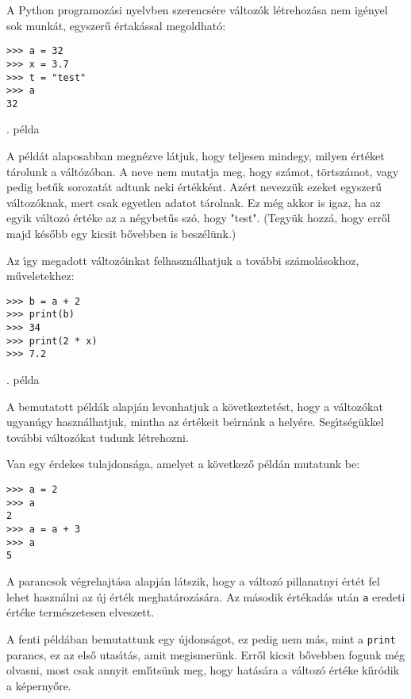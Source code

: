 \documentclass[12pt]{article}
\newcounter{minta}[section]
\newcommand{\incminta}{\stepcounter{minta}}
\newcounter{megold}
\begin{document}
A Python programoz\'asi nyelvben szerencs\'ere v\'altoz\'ok l\'etrehoz\'asa nem ig\'enyel sok 
munk\'at, egyszer\H{u} \'ertak\'assal megoldhat\'o:

\incminta
\begin{Verbatim}[fontsize=\small]
>>> a = 32
>>> x = 3.7
>>> t = "test"
>>> a
32
\end{Verbatim}
\theminta. p\'elda

\noindent A p\'eld\'at alaposabban megn\'ezve l\'atjuk, hogy teljesen mindegy, milyen \'ert\'eket t\'arolunk a 
v\'alt\'o\-z\'o\-ban. A neve nem mutatja meg, hogy sz\'amot, t\"ortsz\'amot, vagy pedig bet\H{u}k 
sorozat\'at adtunk neki \'ert\'ekk\'ent. Az\'ert nevezz\"uk ezeket egyszer\H{u} v\'al\-to\-z\'ok\-nak, 
mert csak egyetlen adatot t\'arolnak. Ez m\'eg akkor is igaz, ha az egyik v\'altoz\'o \'ert\'eke az a 
n\'egybet\H{u}s sz\'o, hogy "test". (Tegy\"uk hozz\'a, hogy err\H{o}l majd k\'es\H{o}bb egy kicsit 
b\H{o}vebben is besz\'el\"unk.)

Az \'{\i}gy megadott v\'altoz\'oinkat felhaszn\'alhatjuk a tov\'abbi sz\'amol\'asokhoz, m\H{u}ve\-le\-tek\-hez:

\incminta
\begin{Verbatim}[fontsize=\small]
>>> b = a + 2
>>> print(b)
>>> 34
>>> print(2 * x)
>>> 7.2
\end{Verbatim}
\theminta. p\'elda

\noindent A bemutatott p\'eld\'ak alapj\'an levonhatjuk a k\"ovetkeztet\'est, hogy a v\'altoz\'okat u\-gyan\-\'ugy 
hasz\-n\'al\-hat\-juk, mintha az \'ert\'ekeit be\'{\i}rn\'ank a hely\'ere. Seg\'{\i}ts\'eg\"ukkel tov\'abbi 
v\'altoz\'okat tudunk l\'etrehozni.

Van egy \'erdekes tulajdons\'aga, amelyet a k\"ovetkez\H{o} p\'eld\'an mutatunk be:

\begin{Verbatim}[fontsize=\small]
>>> a = 2
>>> a
2
>>> a = a + 3
>>> a
5
\end{Verbatim}

\noindent A parancsok v\'egrehajt\'asa alapj\'an l\'atszik, hogy a v\'altoz\'o pillanatnyi \'ert\'et fel lehet haszn\'alni 
az \'uj \'ert\'ek meghat\'aroz\'as\'ara. Az m\'asodik \'ert\'ekad\'as ut\'an {\tt a} eredeti \'ert\'eke 
term\'eszetesen elveszett.

A fenti p\'eld\'aban bemutattunk egy \'ujdons\'agot, ez pedig nem m\'as, mint a {\tt print} parancs, 
ez az els\H{o} utas\'{\i}t\'as, amit megismer\"unk. Err\H{o}l kicsit b\H{o}vebben fogunk m\'eg olvasni, 
most csak annyit eml\'{\i}ts\"unk meg, hogy hat\'as\'ara a v\'altoz\'o \'ert\'eke ki\'{\i}r\'odik a k\'eperny\H{o}re.
\end{document}
